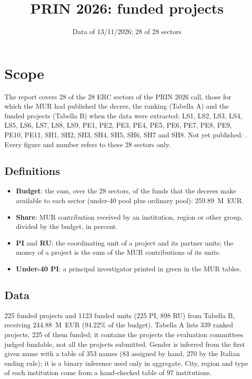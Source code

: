 \documentclass[11pt,a4paper]{article}
\title{PRIN 2026: funded projects}
\author{}
\date{Data of 13/11/2026; 28 of 28 sectors}
\begin{document}
\maketitle
\section{Scope}
The report covers 28 of the 28 ERC sectors of the PRIN 2026 call,
those for which the MUR had published the decree, the ranking (Tabella A) and the funded projects
(Tabella B) when the data were extracted: LS1, LS2, LS3, LS4, LS5, LS6, LS7, LS8, LS9, PE1, PE2, PE3, PE4, PE5, PE6, PE7, PE8, PE9, PE10, PE11, SH1, SH2, SH3, SH4, SH5, SH6, SH7 and SH8. Not yet published: .
Every figure and number refers to these 28 sectors only.

\subsection{Definitions}
\begin{itemize}
\item \textbf{Budget}: the sum, over the 28 sectors, of the funds that the decrees make
available to each sector (under-40 pool plus ordinary pool): 259.89~M~EUR.
\item \textbf{Share}: MUR contribution received by an institution, region or other group, divided by the budget, in percent.
\item \textbf{PI} and \textbf{RU}: the coordinating unit of a project and its partner units; the money of a project is the sum of the MUR contributions of its units.
\item \textbf{Under-40 PI}: a principal investigator printed in green in the MUR tables.
\end{itemize}

\subsection{Data}
225 funded projects and 1123 funded units (225 PI, 898 RU) from Tabella B, receiving 244.88~M~EUR (94.22\% of the budget).
Tabella A lists 339 ranked projects, 225 of them funded; it contains the projects the evaluation committees judged fundable, not all the projects submitted.
Gender is inferred from the first given name with a table of 353 names (83 assigned by hand, 270 by the Italian ending rule); it is a binary inference used only in aggregate.
City, region and type of each institution come from a hand-checked table of 97 institutions.
\end{document}
